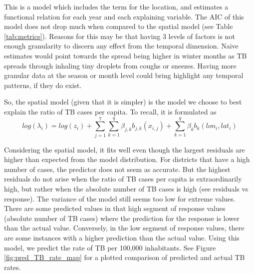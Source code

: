 This is a model which includes the term for the location, and estimates a functional relation for
each year and each explaining variable. The AIC of this model does not drop much when compared to the spatial model (see Table \ref{tab:metrics}). Reasons for this may be that having 3 levels of factors is not enough granularity to discern any effect from the temporal dimension. Naive estimates would point towards the spread being higher in winter months as TB spreads through inhaling tiny droplets from coughs or sneezes. Having more granular data at the season or month level could bring highlight any temporal patterns, if they do exist.
\newline

So, the spatial model (given that it is simpler) is the model we choose to best explain the ratio of TB cases per capita. To recall, it is formulated as 
$$
log(\lambda_i) = log(z_i) +  \sum_{j=1}^{7}\sum_{k=1}^{q}\beta_{j,k}b_{j,k}(x_{i,j}) + \sum_{k=1}^{q}\beta_{k}b_{k}(lon_i , lat_i) 
$$

Considering the spatial model, it fits well even though the largest residuals are higher
than expected from the model distribution. For districts that have a high number of cases, the predictor does
not seem as accurate. But the highest residuals do not arise when the ratio of TB cases per capita
is extraordinarily high, but rather when the absolute number of TB cases is high (see residuals vs response).
The variance of the model still seems too low for extreme values. There are some predicted values in
that high segment of response values (absolute number of TB cases) where the prediction for the response
is lower than the actual value. Conversely, in the low segment of response values, there are some instances with a higher prediction than the actual value. Using this model, we predict the rate of TB per 100,000 inhabitants. See Figure \ref{fig:pred_TB_rate_map} for a plotted comparison of predicted and actual TB rates.

